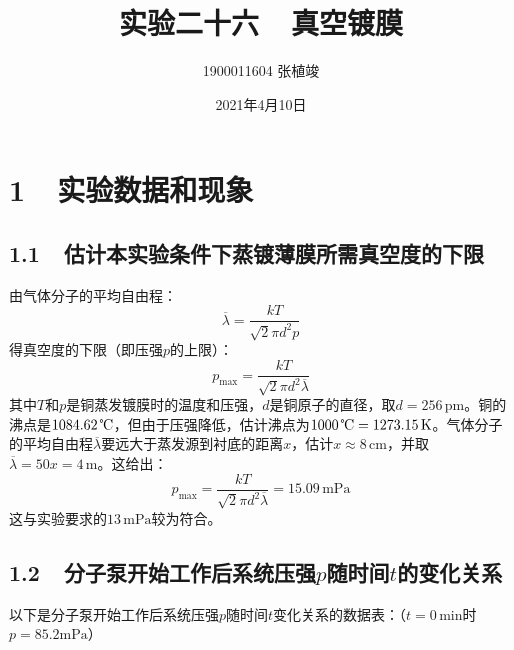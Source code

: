 \documentclass[a4paper,fontset=windows]{ctexart}
\begin{document}
    \title{\textbf{实验二十六\ \ 真空镀膜}}
    \author{1900011604 张植竣}
    \date{2021年4月10日}

    \maketitle

    \section*{1\ \ 实验数据和现象}

    \subsection*{1.1\ \ 估计本实验条件下蒸镀薄膜所需真空度的下限}

    由气体分子的平均自由程：
    \[
    \overline{\lambda} = \frac{kT}{\sqrt{2}\pi d^2 p}
    \]
    得真空度的下限（即压强$p$的上限）：
    \[
    p_\mathrm{max} = \frac{kT}{\sqrt{2}\pi d^2 \overline{\lambda}}
    \]
    其中$T$和$p$是铜蒸发镀膜时的温度和压强，$d$是铜原子的直径，取$d=256\,\mathrm{pm}$。铜的沸点是$1084.62\,\text{\textcelsius}$，但由于压强降低，估计沸点为$1000\,\text{\textcelsius} = 1273.15\,\mathrm{K}$。气体分子的平均自由程$\overline{\lambda}$要远大于蒸发源到衬底的距离$x$，估计$x \approx 8\,\mathrm{cm}$，并取$\overline{\lambda} = 50x = 4\,\mathrm{m}$。这给出：
    \[
    p_\mathrm{max} = \frac{kT}{\sqrt{2}\pi d^2 \overline{\lambda}} = 15.09\,\mathrm{mPa}
    \]
    这与实验要求的$13\,\mathrm{mPa}$较为符合。

    \newpage
    \subsection*{1.2\ \ 分子泵开始工作后系统压强$p$随时间$t$的变化关系}

    以下是分子泵开始工作后系统压强$p$随时间$t$变化关系的数据表：（$t=0\,\mathrm{min}$时$p=85.2\mathrm{mPa}$）
\end{document}
